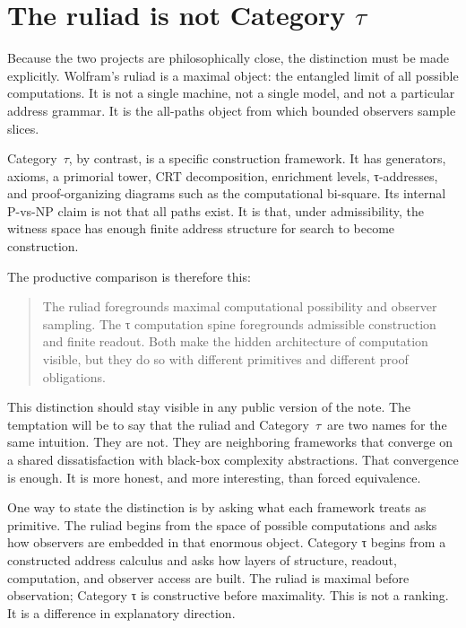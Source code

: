 \documentclass{pantarhei-researchnote}
\newcommand{\CategoryTau}{Category~\(\tau\)}
\begin{document}
\section{The ruliad is not \texorpdfstring{Category $\tau$}{Category tau}}
\label{sec:ruliad}

Because the two projects are philosophically close, the distinction must
be made explicitly. Wolfram's ruliad is a maximal object: the entangled
limit of all possible computations. It is not a single machine, not a
single model, and not a particular address grammar. It is the all-paths
object from which bounded observers sample slices.

\CategoryTau, by contrast, is a specific construction framework. It has
generators, axioms, a primorial tower, CRT decomposition, enrichment
levels, τ-addresses, and proof-organizing diagrams such as the
computational bi-square. Its internal P-vs-NP claim is not that all paths
exist. It is that, under admissibility, the witness space has enough
finite address structure for search to become construction.

The productive comparison is therefore this:

\begin{quote}\small
The ruliad foregrounds maximal computational possibility and observer
sampling. The τ computation spine foregrounds admissible construction and
finite readout. Both make the hidden architecture of computation visible,
but they do so with different primitives and different proof obligations.
\end{quote}

This distinction should stay visible in any public version of the note.
The temptation will be to say that the ruliad and \CategoryTau\ are two
names for the same intuition. They are not. They are neighboring
frameworks that converge on a shared dissatisfaction with black-box
complexity abstractions. That convergence is enough. It is more honest,
and more interesting, than forced equivalence.

One way to state the distinction is by asking what each framework treats
as primitive. The ruliad begins from the space of possible computations
and asks how observers are embedded in that enormous object. Category τ
begins from a constructed address calculus and asks how layers of
structure, readout, computation, and observer access are built. The
ruliad is maximal before observation; Category τ is constructive before
maximality. This is not a ranking. It is a difference in explanatory
direction.
\end{document}
